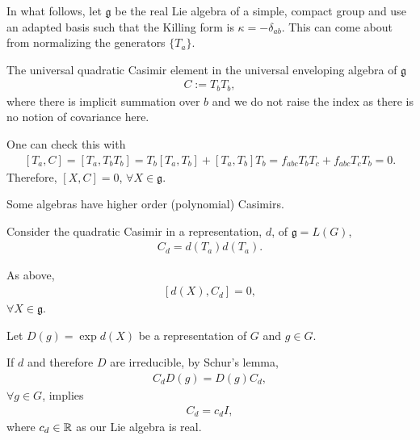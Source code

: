 

In what follows, let $\mathfrak{g}$ be the real Lie algebra of a simple, compact group and use an adapted basis such that the Killing form is $\kappa = - \delta_{ab}$. This can come about from normalizing the generators $\{T_a\}$. 

The universal quadratic Casimir element in the universal enveloping algebra of $\mathfrak{g}$
\begin{align}
    C := T_b T_{b}
,\end{align}
where there is implicit summation over $b$ and we do not raise the index as there is no notion of covariance here.

One can check this with
\begin{align}
    \left[ T_a, C \right] = \left[ T_a, T_b T_{b} \right] = T_b \left[ T_a, T_{b} \right] + \left[ T_a, T_b \right] T_{b} = f_{abc} T_b T_c + f_{abc} T_c T_b = 0
.\end{align}
Therefore, $\left[ X, C \right] = 0$, $\forall X \in \mathfrak{g}$.

Some algebras have higher order (polynomial) Casimirs.

Consider the quadratic Casimir in a representation, $d$, of $\mathfrak{g} = L \left( G \right) $,
\begin{align}
    C_d = d\left( T_a \right) d \left( T_a \right) 
.\end{align}

As above,
\begin{align}
    \left[ d\left( X \right) , C_d \right] = 0
,\end{align}
$\forall X \in \mathfrak{g}$.

Let $D \left( g \right) = \exp d \left( X \right) $ be a representation of $G$ and $g \in G$.

If $d$ and therefore $D$ are irreducible, by Schur's lemma,
\begin{align}
    C_d D \left( g \right) = D\left( g \right) C_d
,\end{align}
$\forall g \in G$, implies
\begin{align}
    C_d = c_d I
,\end{align}
where $c_d \in \mathbb{R}$ as our Lie algebra is real.

